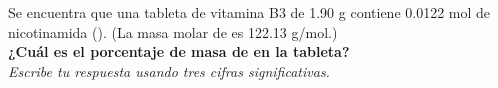 Se encuentra que una tableta de vitamina B3 de 1.90 g contiene 0.0122 mol de nicotinamida (). (La masa molar de  es 122.13 g/mol.)\\
\textbf{¿Cuál es el porcentaje de masa de  en la tableta?}\\
\emph{Escribe tu respuesta usando tres cifras significativas.}\\